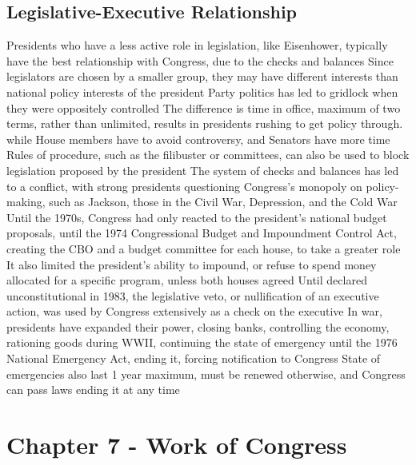 \documentclass[11 pt, twoside]{article}
\newenvironment{outline*}
{
	\begin{outline}[enumerate]
	}
	{\end{outline}
}
\begin{document}
\subsection{Legislative-Executive Relationship}
\begin{outline*}
\1 Presidents who have a less active role in legislation, like Eisenhower, typically have the best relationship with Congress, due to the checks and balances
\2 Since legislators are chosen by a smaller group, they may have different interests than national policy interests of the president
\2 Party politics has led to gridlock when they were oppositely controlled
\2 The difference is time in office, maximum of two terms, rather than unlimited, results in presidents rushing to get policy through. while House members have to avoid controversy, and Senators have more time
\2 Rules of procedure, such as the filibuster or committees, can also be used to block legislation proposed by the president
\1 The system of checks and balances has led to a conflict, with strong presidents questioning Congress’s monopoly on policy-making, such as Jackson, those in the Civil War, Depression, and the Cold War
\1 Until the 1970s, Congress had only reacted to the president’s national budget proposals, until the 1974 Congressional Budget and Impoundment Control Act, creating the CBO and a budget committee for each house, to take a greater role
\2 It also limited the president’s ability to impound, or refuse to spend money allocated for a specific program, unless both houses agreed
\1 Until declared unconstitutional in 1983, the legislative veto, or nullification of an executive action, was used by Congress extensively as a check on the executive
\1 In war, presidents have expanded their power, closing banks, controlling the economy, rationing goods during WWII, continuing the state of emergency until the 1976 National Emergency Act, ending it, forcing notification to Congress
\2 State of emergencies also last 1 year maximum, must be renewed otherwise, and Congress can pass laws ending it at any time
\end{outline*}
\section{Chapter 7 - Work of Congress}
\end{document}
